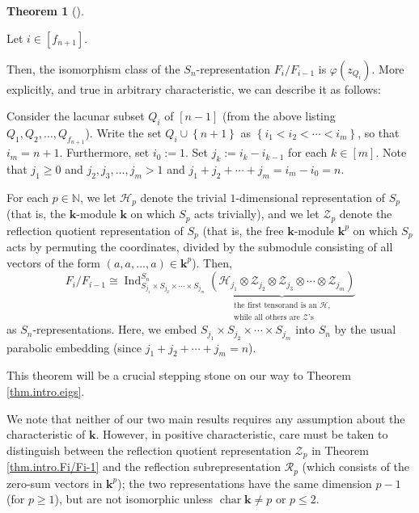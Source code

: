 \documentclass[numbers=enddot,12pt,final,onecolumn,notitlepage]{scrartcl}%
\theoremstyle{definition}
\newtheorem{theo}{Theorem}[section]
\newenvironment{theorem}[1][]
{\begin{theo}[#1]\begin{leftbar}}
{\end{leftbar}\end{theo}}
\newenvironment{noncompile}{}{}
\begin{document}
\begin{theorem}
[part of Theorem \ref{thm.Fi/Fi-1.as-ind}]\label{thm.intro.Fi/Fi-1}Let
$i\in\left[  f_{n+1}\right]  $.

\begin{noncompile}
Then, the isomorphism class of the $S_{n}$-representation $F_{i}/F_{i-1}$ is
$\varphi\left(  z_{Q_{i}}\right)  $. More explicitly, and true in arbitrary
characteristic, we can describe it as follows:
\end{noncompile}

Consider the lacunar subset $Q_{i}$ of $\left[  n-1\right]  $ (from the above
listing $Q_{1},Q_{2},\ldots,Q_{f_{n+1}}$). Write the set $Q_{i}\cup\left\{
n+1\right\}  $ as $\left\{  i_{1}<i_{2}<\cdots<i_{m}\right\}  $, so that
$i_{m}=n+1$. Furthermore, set $i_{0}:=1$. Set $j_{k}:=i_{k}-i_{k-1}$ for each
$k\in\left[  m\right]  $. Note that $j_{1}\geq0$ and $j_{2},j_{3},\ldots
,j_{m}>1$ and $j_{1}+j_{2}+\cdots+j_{m}=i_{m}-i_{0}=n$.

For each $p\in\mathbb{N}$, we let $\mathcal{H}_{p}$ denote the trivial
$1$-dimensional representation of $S_{p}$ (that is, the $\mathbf{k}$-module
$\mathbf{k}$ on which $S_{p}$ acts trivially), and we let $\mathcal{Z}_{p}$
denote the reflection quotient representation of $S_{p}$ (that is, the free
$\mathbf{k}$-module $\mathbf{k}^{p}$ on which $S_{p}$ acts by permuting the
coordinates, divided by the submodule consisting of all vectors of the form
$\left(  a,a,\ldots,a\right)  \in\mathbf{k}^{p}$). Then,%
\[
F_{i}/F_{i-1}\cong\operatorname*{Ind}\nolimits_{S_{j_{1}}\times S_{j_{2}%
}\times\cdots\times S_{j_{m}}}^{S_{n}}\underbrace{\left(  \mathcal{H}_{j_{1}%
}\otimes\mathcal{Z}_{j_{2}}\otimes\mathcal{Z}_{j_{3}}\otimes\cdots
\otimes\mathcal{Z}_{j_{m}}\right)  }_{\substack{\text{the first tensorand is
an }\mathcal{H}\text{,}\\\text{while all others are }\mathcal{Z}\text{'s}}}
\]
as $S_{n}$-representations. Here, we embed $S_{j_{1}}\times S_{j_{2}}%
\times\cdots\times S_{j_{m}}$ into $S_{n}$ by the usual parabolic embedding
(since $j_{1}+j_{2}+\cdots+j_{m}=n$).
\end{theorem}

This theorem will be a crucial stepping stone on our way to Theorem
\ref{thm.intro.eigs}.

We note that neither of our two main results requires any assumption about the
characteristic of $\mathbf{k}$. However, in positive characteristic, care must
be taken to distinguish between the reflection quotient representation
$\mathcal{Z}_{p}$ in Theorem \ref{thm.intro.Fi/Fi-1} and the reflection
subrepresentation $\mathcal{R}_{p}$ (which consists of the zero-sum vectors in
$\mathbf{k}^{p}$); the two representations have the same dimension $p-1$ (for
$p\geq1$), but are not isomorphic unless $\operatorname*{char}\mathbf{k}\neq
p$ or $p\leq2$.
\end{document}
